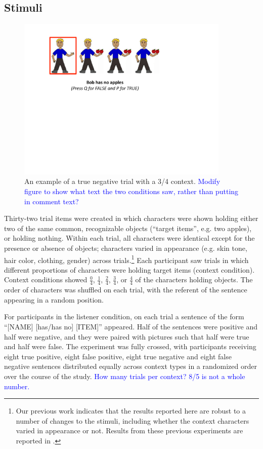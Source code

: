 \documentclass[man, noapacite]{apa2}
\newcommand{\blue}[1]{\textcolor{blue}{#1}}
\begin{document}
\subsection{Stimuli}

\begin{figure}[t]
\begin{center} 
\includegraphics[width=4in]{figures/trialfig.pdf}
\caption{\label{fig:trial} An example of a true negative trial with a 3/4 context. \blue{Modify figure to show what text the two conditions saw, rather than putting in comment text?}}
\vspace{-5mm}
\end{center} 
\end{figure}

Thirty-two trial items were created in which characters were shown holding either two of the same common, recognizable objects (``target items'', e.g. two apples), or holding nothing.  Within each trial, all characters were identical except for the presence or absence of objects; characters varied in appearance (e.g. skin tone, hair color, clothing, gender) across trials.\footnote{Our previous work indicates that the results reported here are robust to a number of changes to the stimuli, including whether the context characters varied in appearance or not. Results from these previous experiments are reported in .} Each participant saw trials in which different proportions of characters were holding target items (context condition).  Context conditions showed $\frac{0}{4}$, $\frac{1}{4}$, $\frac{2}{4}$, $\frac{3}{4}$, or $\frac{4}{4}$ of the characters holding objects. The order of characters was shuffled on each trial, with the referent of the sentence appearing in a random position. 

For participants in the listener condition, on each trial a sentence of the form ``[NAME] [has/has no] [ITEM]'' appeared.  Half of the sentences were positive and half were negative, and they were paired with pictures such that half were true and half were false.  The experiment was fully crossed, with participants receiving eight true positive, eight false positive, eight true negative and eight false negative sentences distributed equally across context types in a randomized order over the course of the study.  \blue{How many trials per context? 8/5 is not a whole number.}
\end{document}
